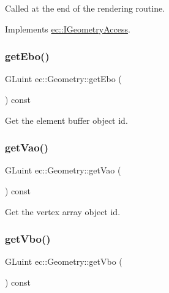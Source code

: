 Called at the end of the rendering routine. 



Implements \mbox{\hyperlink{classec_1_1_i_geometry_access_a6d3b9c34a8b73aeac26663ef349ce41f}{ec\+::\+I\+Geometry\+Access}}.

\mbox{\label{classec_1_1_geometry_a5d956ff01a7b6648ede8982e0a461ae0}} 
\subsubsection{\texorpdfstring{get\+Ebo()}{getEbo()}}
{\footnotesize\ttfamily G\+Luint ec\+::\+Geometry\+::get\+Ebo (\begin{DoxyParamCaption}{ }\end{DoxyParamCaption}) const}



Get the element buffer object id. 

\mbox{\label{classec_1_1_geometry_a91a89baad39d4f2b2c4e9774d952dce9}} 
\subsubsection{\texorpdfstring{get\+Vao()}{getVao()}}
{\footnotesize\ttfamily G\+Luint ec\+::\+Geometry\+::get\+Vao (\begin{DoxyParamCaption}{ }\end{DoxyParamCaption}) const}



Get the vertex array object id. 

\mbox{\label{classec_1_1_geometry_abad5d4311d16462099b8f9d084d99dd4}} 
\subsubsection{\texorpdfstring{get\+Vbo()}{getVbo()}}
{\footnotesize\ttfamily G\+Luint ec\+::\+Geometry\+::get\+Vbo (\begin{DoxyParamCaption}{ }\end{DoxyParamCaption}) const}



